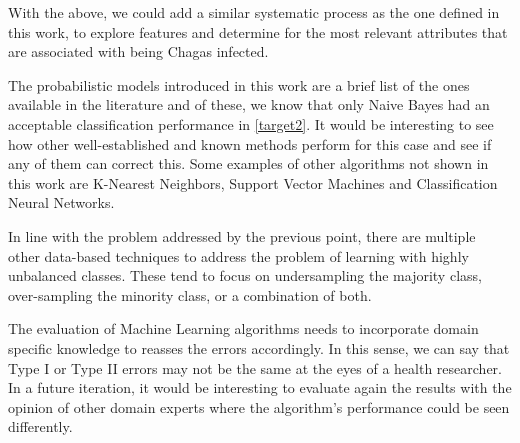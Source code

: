 \begin{description}
    \item With the above, we could add a similar systematic process as the one defined in this work, to explore features and determine for the most relevant attributes that are associated with being Chagas infected.

    \item [Test other classifiers] The probabilistic models introduced in this work are a brief list of the ones available in the literature and of these, we know that only Naive Bayes had an acceptable classification performance in \cref{target2}.
    It would be interesting to see how other well-established and known methods perform for this case and see if any of them can correct this.
    Some examples of other algorithms not shown in this work are K-Nearest Neighbors, Support Vector Machines and Classification Neural Networks.   

    \item [Test other pre-processing techniques] In line with the problem addressed by the previous point, there are multiple other data-based techniques to address the problem of learning with highly unbalanced classes.
    These tend to focus on undersampling the majority class, over-sampling the minority class, or a combination of both.


    \item [Domain Evaluation] The evaluation of Machine Learning algorithms needs to incorporate domain specific knowledge to reasses the errors accordingly. In this sense, we can say that Type I or Type II errors may not be the same at the eyes of a health researcher.
    In a future iteration, it would be interesting to evaluate again the results with the opinion of other domain experts where the algorithm's performance could be seen differently.

\end{description}

